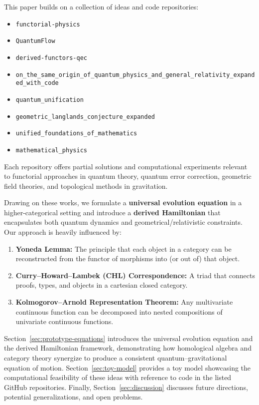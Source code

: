 \documentclass[11pt]{article}
\begin{document}
This paper builds on a collection of ideas and code repositories:
\begin{itemize}
    \item \texttt{functorial-physics}
    \item \texttt{QuantumFlow}
    \item \texttt{derived-functors-qec}
    \item \texttt{on\_the\_same\_origin\_of\_quantum\_physics\_and\_general\_relativity\_expanded\_with\_code}
    \item \texttt{quantum\_unification}
    \item \texttt{geometric\_langlands\_conjecture\_expanded}
    \item \texttt{unified\_foundations\_of\_mathematics}
    \item \texttt{mathematical\_physics}
\end{itemize}
Each repository offers partial solutions and computational experiments relevant to functorial approaches in quantum theory, quantum error correction, geometric field theories, and topological methods in gravitation.

Drawing on these works, we formulate a \textbf{universal evolution equation} in a higher-categorical setting and introduce a \textbf{derived Hamiltonian} that encapsulates both quantum dynamics and geometrical/relativistic constraints. Our approach is heavily influenced by:
\begin{enumerate}
    \item \textbf{Yoneda Lemma:} The principle that each object in a category can be reconstructed from the functor of morphisms into (or out of) that object.
    \item \textbf{Curry--Howard--Lambek (CHL) Correspondence:} A triad that connects proofs, types, and objects in a cartesian closed category. 
    \item \textbf{Kolmogorov--Arnold Representation Theorem:} Any multivariate continuous function can be decomposed into nested compositions of univariate continuous functions.
\end{enumerate}

Section~\ref{sec:prototype-equations} introduces the universal evolution equation and the derived Hamiltonian framework, demonstrating how homological algebra and category theory synergize to produce a consistent quantum–gravitational equation of motion. Section~\ref{sec:toy-model} provides a toy model showcasing the computational feasibility of these ideas with reference to code in the listed GitHub repositories. Finally, Section~\ref{sec:discussion} discusses future directions, potential generalizations, and open problems.
\end{document}
